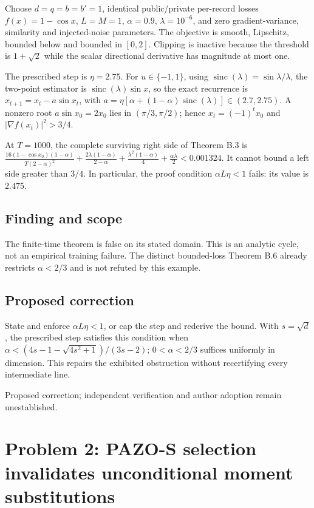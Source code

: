 \documentclass[11pt]{article}
\begin{document}
Choose \(d=q=b=b'=1\), identical public/private per-record losses \(f(x)=1-\cos x\), \(L=M=1\), \(\alpha=0.9\), \(\lambda=10^{-6}\), and zero gradient-variance, similarity and injected-noise parameters. The objective is smooth, Lipschitz, bounded below and bounded in \([0,2]\). Clipping is inactive because the threshold is \(1+\sqrt2\) while the scalar directional derivative has magnitude at most one.

The prescribed step is \(\eta=2.75\). For \(u\in\{-1,1\}\), using \(\operatorname{sinc}(\lambda)=\sin\lambda/\lambda\), the two-point estimator is \(\operatorname{sinc}(\lambda)\sin x\), so the exact recurrence is \(x_{t+1}=x_t-a\sin x_t\), with \(a=\eta[\alpha+(1-\alpha)\operatorname{sinc}(\lambda)]\in(2.7,2.75)\). A nonzero root \(a\sin x_0=2x_0\) lies in \((\pi/3,\pi/2)\); hence \(x_t=(-1)^t x_0\) and \(|\nabla f(x_t)|^2>3/4\).

At \(T=1000\), the complete surviving right side of Theorem B.3 is \(\frac{16(1-\cos x_0)(1-\alpha)}{T(2-\alpha)^2}+\frac{2\lambda(1-\alpha)}{2-\alpha}+\frac{\lambda^2(1-\alpha)}4+\frac{\alpha\lambda}2<0.001324\). It cannot bound a left side greater than \(3/4\). In particular, the proof condition \(\alpha L\eta<1\) fails: its value is \(2.475\).

\subsection*{Finding and scope}

The finite-time theorem is false on its stated domain. This is an analytic cycle, not an empirical training failure. The distinct bounded-loss Theorem B.6 already restricts \(\alpha<2/3\) and is not refuted by this example.

\subsection*{Proposed correction}

State and enforce \(\alpha L\eta<1\), or cap the step and rederive the bound. With \(s=\sqrt d\), the prescribed step satisfies this condition when \(\alpha<(4s-1-\sqrt{4s^2+1})/(3s-2)\); \(0<\alpha<2/3\) suffices uniformly in dimension. This repairs the exhibited obstruction without recertifying every intermediate line.

Proposed correction; independent verification and author adoption remain unestablished.

\section*{Problem 2: PAZO-S selection invalidates unconditional moment substitutions}
\end{document}

